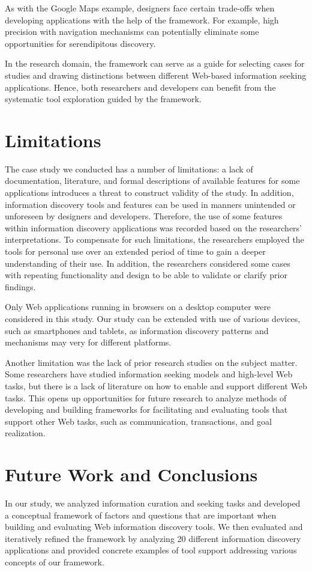 \documentclass{casconpaper}
\begin{document}
{{As with the Google Maps example, designers face certain trade-offs when developing applications with the help of the framework. For example, high precision with navigation mechanisms can potentially eliminate some opportunities for serendipitous discovery. 

In the research domain, the framework can serve as a guide for selecting cases for studies and drawing distinctions between different Web-based information seeking applications. Hence, both researchers and developers can benefit from the systematic tool exploration guided by the framework.

} %

{\section{Limitations}
The case study we conducted has a number of limitations: a lack of documentation, literature, and formal descriptions of available features for some applications introduces a threat to construct validity of the study. In addition, information discovery tools and features can be used in manners unintended or unforeseen by designers and developers. Therefore, the use of some features within information discovery applications was recorded based on the researchers' interpretations. To compensate for such limitations, the researchers employed the tools for personal use over an extended period of time to gain a deeper understanding of their use. In addition, the researchers considered some cases with repeating functionality and design to be able to validate or clarify prior findings. 

Only Web applications running in browsers on a desktop computer were considered in this study. Our study can be extended with use of various devices, such as smartphones and tablets, as information discovery patterns and mechanisms may very for different platforms.

Another limitation was the lack of prior research studies on the subject matter. Some researchers have studied information seeking models and high-level Web tasks, but there is a lack of literature on how to enable and support different Web tasks. This opens up opportunities for future research to analyze methods of developing and building frameworks for facilitating and evaluating tools that support other Web tasks, such as communication, transactions, and goal realization.

} %

{\section{ Future Work and Conclusions }
In our study, we analyzed information curation and seeking tasks and developed a conceptual framework of factors and questions that are important when building and evaluating Web information discovery tools. We then evaluated and iteratively refined the framework by analyzing 20 different information discovery applications and provided concrete examples of tool support addressing various concepts of our framework.

}}
\end{document}
